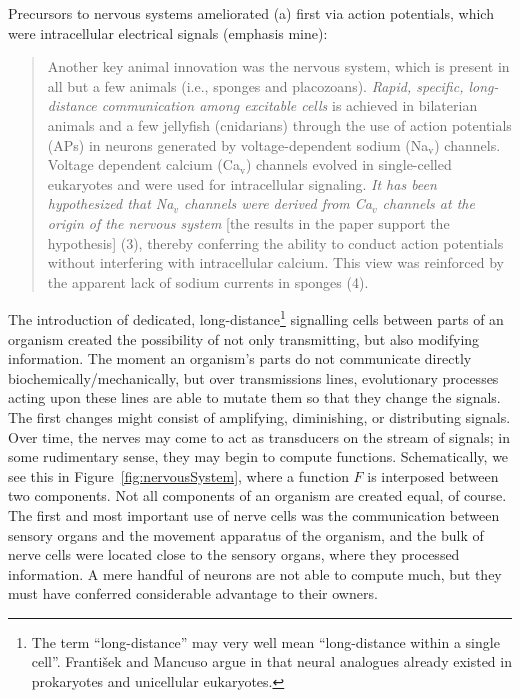 Precursors to nervous systems ameliorated (a) first via action potentials, which were intracellular electrical signals \cite{Liebeskind31052011} (emphasis mine):
\begin{quotation}
Another key animal innovation was the nervous system, which is present in all but a few animals (i.e., sponges and placozoans). {\em Rapid, specific, long-distance communication among excitable cells} is achieved in bilaterian animals and a few jellyfish (cnidarians) through the use of action potentials (APs) in neurons generated by voltage-dependent sodium (Na$_\mathrm{v}$) channels. Voltage dependent calcium (Ca$_\mathrm{v}$) channels evolved in single-celled eukaryotes and were used for intracellular signaling. {\em It has been hypothesized that Na$_v$ channels were derived from Ca$_v$ channels at the origin of the nervous system} \textsf{[the results in the paper support the hypothesis]} (3), thereby conferring the ability to conduct action potentials without interfering with intracellular calcium. This view was reinforced by the apparent lack of sodium currents in sponges (4).
\end{quotation}

The introduction of dedicated, long-distance\footnote{The term ``long-distance'' may very well mean ``long-distance within a single cell''. Franti\v{s}ek and Mancuso argue in \cite{frantisek} that neural analogues already existed in prokaryotes and unicellular eukaryotes.} signalling cells between parts of an organism created the possibility of not only transmitting, but also modifying information. The moment an organism's parts do not communicate directly biochemically/mechanically, but over transmissions lines, evolutionary processes acting upon these lines are able to mutate them so that they change the signals. The first changes might consist of amplifying, diminishing, or distributing signals. Over time, the nerves may come to act as transducers on the stream of signals; in some rudimentary sense, they may begin to compute functions. Schematically, we see this in Figure~\ref{fig:nervousSystem}, where a function $F$ is interposed between two components. Not all components of an organism are created equal, of course. The first and most important use of nerve cells was the communication between sensory organs and the movement apparatus of the organism, and the bulk of nerve cells were located close to the sensory organs, where they processed information. A mere handful of neurons are not able to compute much, but they must have conferred considerable advantage to their owners.

